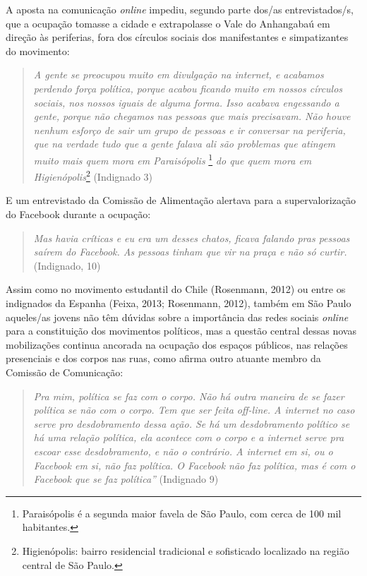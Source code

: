 A aposta na comunicação \emph{online} impediu, segundo parte dos/as
entrevistados/s, que a ocupação tomasse a cidade e extrapolasse o Vale
do Anhangabaú em direção às periferias, fora dos círculos sociais dos
manifestantes e simpatizantes do movimento:

\begin{quote}
\emph{A gente se preocupou muito em divulgação na internet, e acabamos
perdendo força política, porque acabou ficando muito em nossos círculos
sociais, nos nossos iguais de alguma forma. Isso acabava engessando a
gente, porque não chegamos nas pessoas que mais precisavam. Não houve
nenhum esforço de sair um grupo de pessoas e ir conversar na periferia,
que na verdade tudo que a gente falava ali são problemas que atingem
muito mais quem mora em Paraisópolis} \footnote{Paraisópolis é a segunda
  maior favela de São Paulo, com cerca de 100 mil habitantes.} \emph{do
que quem mora em Higienópolis}\footnote{Higienópolis: bairro residencial
  tradicional e sofisticado localizado na região central de São Paulo.}
(Indignado 3)
\end{quote}

E um entrevistado da Comissão de Alimentação alertava para a
supervalorização do Facebook durante a ocupação:

\begin{quote}
\emph{Mas havia críticas e eu era um desses chatos, ficava falando pras
pessoas saírem do Facebook. As pessoas tinham que vir na praça e não só
curtir.} (Indignado, 10)
\end{quote}

Assim como no movimento estudantil do Chile (Rosenmann, 2012) ou entre
os indignados da Espanha (Feixa, 2013; Rosenmann, 2012), também em São
Paulo aqueles/as jovens não têm dúvidas sobre a importância das redes
sociais \emph{online} para a constituição dos movimentos políticos, mas
a questão central dessas novas mobilizações continua ancorada na
ocupação dos espaços públicos, nas relações presenciais e dos corpos nas
ruas, como afirma outro atuante membro da Comissão de Comunicação:

\begin{quote}
\emph{Pra mim, política se faz com o corpo. Não há outra maneira de se
fazer política se não com o corpo. Tem que ser feita off-line. A
internet no caso serve pro desdobramento dessa ação. Se há um
desdobramento político se há uma relação política, ela acontece com o
corpo e a internet serve pra escoar esse desdobramento, e não o
contrário. A internet em si, ou o Facebook em si, não faz política. O
Facebook não faz política, mas é com o Facebook que se faz política''}
(Indignado 9)
\end{quote}


